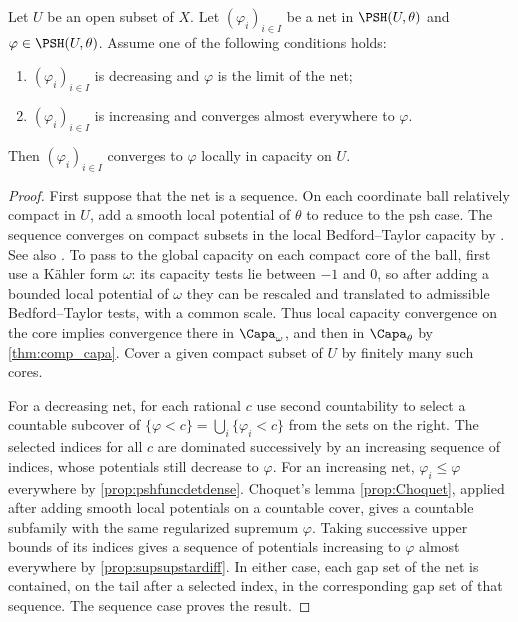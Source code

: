 \begin{proposition}\label{prop:mono_psh_cap}
Let $U$ be an open subset of $X$.
    Let $(\varphi_i)_{i\in I}$ be a net in $\PSH(U,\theta)$ and $\varphi\in \PSH(U,\theta)$. Assume one of the following conditions holds:
    \begin{enumerate}
        \item\label{itm:prop:mono_psh_cap:1} $(\varphi_i)_{i\in I}$ is decreasing and $\varphi$ is the limit of the net;
        \item\label{itm:prop:mono_psh_cap:2} $(\varphi_i)_{i\in I}$ is increasing and converges almost everywhere to $\varphi$.
    \end{enumerate}
    Then $(\varphi_i)_{i\in I}$ converges to $\varphi$ locally in capacity on $U$.
\end{proposition}
\begin{proof}
    First suppose that the net is a sequence. On each coordinate ball relatively compact in $U$, add a smooth local potential of $\theta$ to reduce to the psh case. The sequence converges on compact subsets in the local Bedford--Taylor capacity by \cite[Theorem~7.2]{BT82}. See also \cite[Proposition~15.6.7]{FPT}. To pass to the global capacity on each compact core of the ball, first use a Kähler form $\omega$: its capacity tests lie between $-1$ and $0$, so after adding a bounded local potential of $\omega$ they can be rescaled and translated to admissible Bedford--Taylor tests, with a common scale. Thus local capacity convergence on the core implies convergence there in $\Capa_\omega$, and then in $\Capa_\theta$ by \cref{thm:comp_capa}. Cover a given compact subset of $U$ by finitely many such cores.

    For a decreasing net, for each rational $c$ use second countability to select a countable subcover of $\{\varphi<c\}=\bigcup_i\{\varphi_i<c\}$ from the sets on the right. The selected indices for all $c$ are dominated successively by an increasing sequence of indices, whose potentials still decrease to $\varphi$. For an increasing net, $\varphi_i\leq\varphi$ everywhere by \cref{prop:pshfuncdetdense}. Choquet's lemma \cref{prop:Choquet}, applied after adding smooth local potentials on a countable cover, gives a countable subfamily with the same regularized supremum $\varphi$. Taking successive upper bounds of its indices gives a sequence of potentials increasing to $\varphi$ almost everywhere by \cref{prop:supsupstardiff}. In either case, each gap set of the net is contained, on the tail after a selected index, in the corresponding gap set of that sequence. The sequence case proves the result.
\end{proof}


